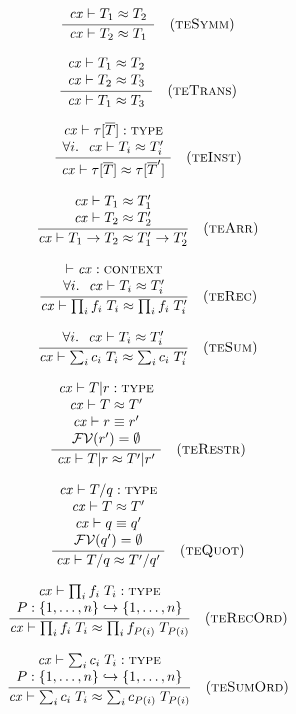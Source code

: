 
\[
\rruleI
 {\teqO{\typ_1}{\typ_2}}
 {\teqO{\typ_2}{\typ_1}}
 {\Rtesymm}
\]

\[
\rruleII
 {\teqO{\typ_1}{\typ_2}}
 {\teqO{\typ_2}{\typ_3}}
 {\teqO{\typ_1}{\typ_3}}
 {\Rtetrans}
\]


\[
\rruleII
 {\istyO{\tinstO}}
 {\FORALL{i}{\teqO{\typ_i}{\typ_i'}}}
 {\teqO{\tinstO}{\tinst{\tnam}{\typS'}}}
 {\Rteinst}
\]

\[
\rruleII
 {\teqO{\typ_1}{\typ_1'}}
 {\teqO{\typ_2}{\typ_2'}}
 {\teqO{\tarr{\typ_1}{\typ_2}}{\tarr{\typ_1'}{\typ_2'}}}
 {\Rtearr}
\]

\[
\rruleII
 {\cxwfO}
 {\FORALL{i}{\teqO{\typ_i}{\typ_i'}}}
 {\teqO{\trecO}{\trec{i}{\fnam_i}{\typ_i'}}}
 {\Rterec}
\]

\[
\rruleI
 {\FORALL{i}{\teqO{\typ_i}{\typ_i'}}}
 {\teqO{\tsumO}{\tsum{i}{\cnam_i}{\typ_i'}}}
 {\Rtesum}
\]

\[
\rruleIV
 {\istyO{\tsubO}}
 {\teqO{\typ}{\typ'}}
 {\theoO{\eq{\tspred}{\tspred'}}}
 {\efvar{\tspred'}=\emptyset}
 {\teqO{\tsubO}{\tsub{\typ'}{\tspred'}}}
 {\Rterestr}
\]

\[
\rruleIV
 {\istyO{\tquotO}}
 {\teqO{\typ}{\typ'}}
 {\theoO{\eq{\tqpred}{\tqpred'}}}
 {\efvar{\tqpred'}=\emptyset}
 {\teqO{\tquotO}{\tquot{\typ'}{\tqpred'}}}
 {\Rtequot}
\]

\[
\rruleII
 {\istyO{\trecO}}
 {\funcinj{\perm}{\setFT{1}{n}}{\setFT{1}{n}}}
 {\teqO{\trecO}{\trec{i}{\fnam_{\perm(i)}}{\typ_{\perm(i)}}}}
 {\Rterecord}
\]

\[
\rruleII
 {\istyO{\tsumO}}
 {\funcinj{\perm}{\setFT{1}{n}}{\setFT{1}{n}}}
 {\teqO{\tsumO}{\tsum{i}{\cnam_{\perm(i)}}{\typ_{\perm(i)}}}}
 {\Rtesumord}
\]



